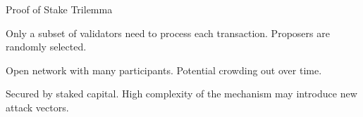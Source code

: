 \documentclass[]{beamer}
\begin{document}
	\begin{frame}{Proof of Stake Trilemma}
		\begin{center}
			\begin{tikzpicture}[scale=0.6, every node/.style ={scale=0.8}]
				
			\end{tikzpicture}
		\end{center}
		
		\begin{description}[labelwidth=10em]
			\item[\textbf{Scalability}] Only a subset of validators need to process each transaction. Proposers are randomly selected.
			\item[\textbf{Decentralization}] Open network with many participants. Potential crowding out over time.
			\item[\textbf{Security}] Secured by staked capital. High complexity of the mechanism may introduce new attack vectors.
		\end{description}
	\end{frame}
	
\end{document}
